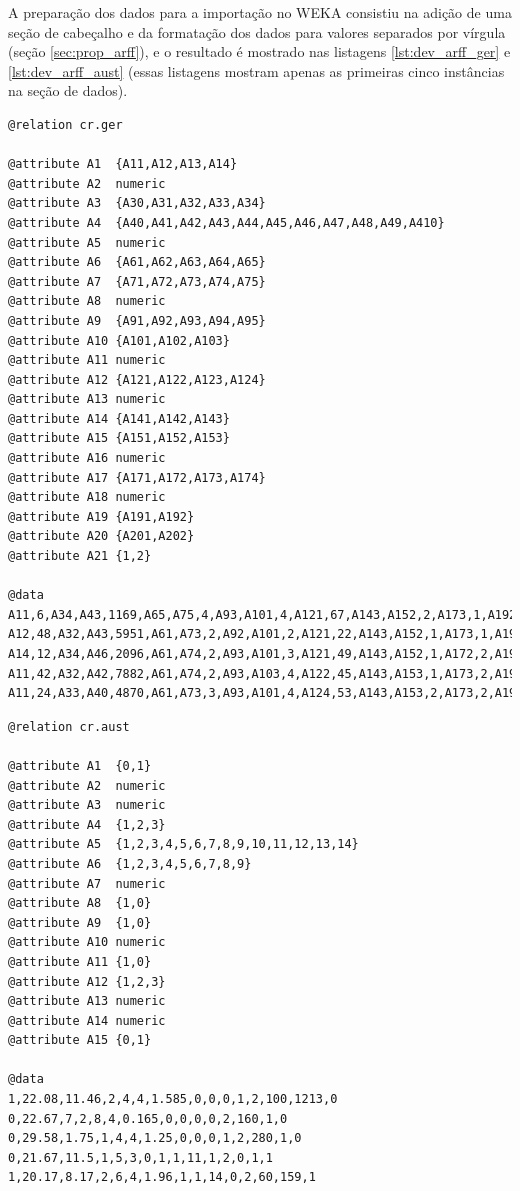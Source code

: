 A preparação dos dados para a importação no WEKA consistiu na adição de uma seção de cabeçalho e da formatação dos dados para valores separados por vírgula (seção \ref{sec:prop_arff}), e o resultado é mostrado nas listagens \ref{lst:dev_arff_ger} e \ref{lst:dev_arff_aust} (essas listagens mostram apenas as primeiras cinco instâncias na seção de dados).

\vspace{0.5cm}
\begin{lstlisting}[caption=Arquivo ARFF do \emph{Cr.Ger}, label=lst:dev_arff_ger]
@relation cr.ger

@attribute A1  {A11,A12,A13,A14}
@attribute A2  numeric
@attribute A3  {A30,A31,A32,A33,A34}
@attribute A4  {A40,A41,A42,A43,A44,A45,A46,A47,A48,A49,A410}
@attribute A5  numeric
@attribute A6  {A61,A62,A63,A64,A65}
@attribute A7  {A71,A72,A73,A74,A75}
@attribute A8  numeric
@attribute A9  {A91,A92,A93,A94,A95}
@attribute A10 {A101,A102,A103}
@attribute A11 numeric
@attribute A12 {A121,A122,A123,A124}
@attribute A13 numeric
@attribute A14 {A141,A142,A143}
@attribute A15 {A151,A152,A153}
@attribute A16 numeric
@attribute A17 {A171,A172,A173,A174}
@attribute A18 numeric
@attribute A19 {A191,A192}
@attribute A20 {A201,A202}
@attribute A21 {1,2}

@data
A11,6,A34,A43,1169,A65,A75,4,A93,A101,4,A121,67,A143,A152,2,A173,1,A192,A201,1
A12,48,A32,A43,5951,A61,A73,2,A92,A101,2,A121,22,A143,A152,1,A173,1,A191,A201,2
A14,12,A34,A46,2096,A61,A74,2,A93,A101,3,A121,49,A143,A152,1,A172,2,A191,A201,1
A11,42,A32,A42,7882,A61,A74,2,A93,A103,4,A122,45,A143,A153,1,A173,2,A191,A201,1
A11,24,A33,A40,4870,A61,A73,3,A93,A101,4,A124,53,A143,A153,2,A173,2,A191,A201,2
\end{lstlisting}
\vspace{0.5cm}

\vspace{0.5cm}
\begin{lstlisting}[caption=Arquivo ARFF do \emph{Cr.Aust}, label=lst:dev_arff_aust]
@relation cr.aust

@attribute A1  {0,1}
@attribute A2  numeric
@attribute A3  numeric
@attribute A4  {1,2,3}
@attribute A5  {1,2,3,4,5,6,7,8,9,10,11,12,13,14}
@attribute A6  {1,2,3,4,5,6,7,8,9}
@attribute A7  numeric
@attribute A8  {1,0}
@attribute A9  {1,0}
@attribute A10 numeric
@attribute A11 {1,0}
@attribute A12 {1,2,3}
@attribute A13 numeric
@attribute A14 numeric
@attribute A15 {0,1}

@data
1,22.08,11.46,2,4,4,1.585,0,0,0,1,2,100,1213,0
0,22.67,7,2,8,4,0.165,0,0,0,0,2,160,1,0
0,29.58,1.75,1,4,4,1.25,0,0,0,1,2,280,1,0
0,21.67,11.5,1,5,3,0,1,1,11,1,2,0,1,1
1,20.17,8.17,2,6,4,1.96,1,1,14,0,2,60,159,1
\end{lstlisting}
\vspace{0.5cm}

